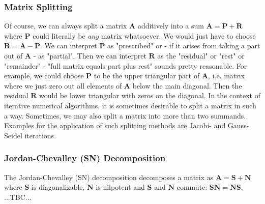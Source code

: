 
\subsubsection{Matrix Splitting}
Of course, we can always split a matrix $\mathbf{A}$ additively into a sum $\mathbf{A} = \mathbf{P + R}$ where $\mathbf{P}$ could literally be \emph{any} matrix whatsoever. We would just have to choose $\mathbf{R} = \mathbf{A - P}$. We can interpret $\mathbf{P}$ as "prescribed" or - if it arises from taking a part out of $\mathbf{A}$ - as "partial". Then we can interpret $\mathbf{R}$ as the "residual" or "rest" or "remainder" - "full matrix equals part plus rest" sounds pretty reasonable. For example, we could choose $\mathbf{P}$ to be the upper triangular part of $\mathbf{A}$, i.e. matrix where we just zero out all elements of $\mathbf{A}$ below the main diagonal. Then the residual $\mathbf{R}$ would be lower triangular with zeros on the diagonal. In the context of iterative numerical algorithms, it is sometimes desirable to split a matrix in such a way. Sometimes, we may also split a matrix into more than two summands. Examples for the application of such splitting methods are Jacobi- and Gauss-Seidel iterations.




\subsubsection{Jordan-Chevalley (SN) Decomposition}
The Jordan-Chevalley (SN) decomposition decomposes a matrix as $\mathbf{A} =  \mathbf{S + N}$ where $\mathbf{S}$ is diagonalizable, $\mathbf{N}$ is nilpotent and $\mathbf{S}$ and $\mathbf{N}$ commute:
$\mathbf{SN} = \mathbf{NS}$. ...TBC...




